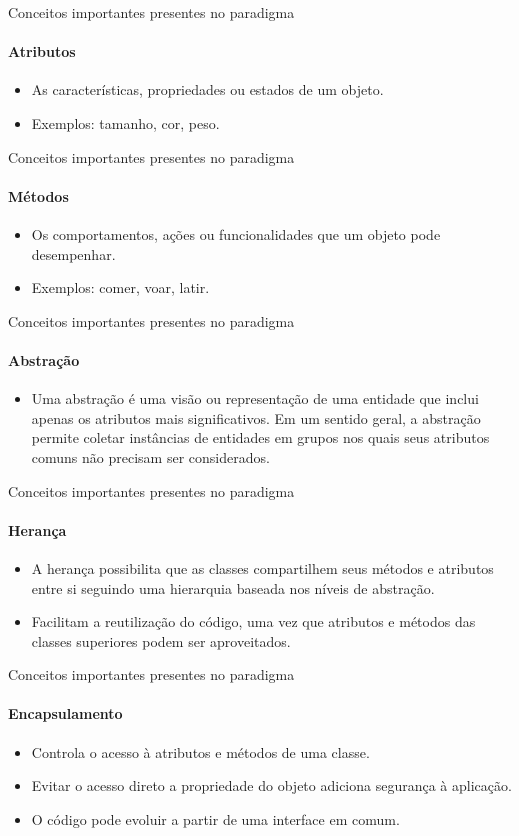 \begin{frame}{Conceitos importantes presentes no paradigma}
\framesubtitle{Atributos}
\begin{itemize}
    \item As características, propriedades ou estados de um objeto.
    \item Exemplos: tamanho, cor, peso. 
\end{itemize} 
\end{frame}

\begin{frame}{Conceitos importantes presentes no paradigma}
\framesubtitle{Métodos}
\begin{itemize}
    \item Os comportamentos, ações ou funcionalidades que um objeto pode desempenhar.
    \item Exemplos: comer, voar, latir.
\end{itemize} 
\end{frame}

\begin{frame}{Conceitos importantes presentes no paradigma}
\framesubtitle{Abstração}
\begin{itemize}
    \item Uma abstração é uma visão ou representação de uma entidade que inclui apenas os atributos mais significativos. Em um sentido geral, a abstração permite coletar instâncias de entidades em grupos nos quais seus atributos comuns não precisam ser considerados.
\end{itemize} 
\end{frame}

\begin{frame}{Conceitos importantes presentes no paradigma}
\framesubtitle{Herança}
\begin{itemize}
    \item A herança possibilita que as classes compartilhem seus métodos e atributos entre si seguindo uma hierarquia baseada nos níveis de abstração.
    \item Facilitam a reutilização do código, uma vez que atributos e métodos das classes superiores podem ser aproveitados.
\end{itemize} 
\end{frame}

\begin{frame}{Conceitos importantes presentes no paradigma}
\framesubtitle{Encapsulamento}
\begin{itemize}
    \item Controla o acesso à atributos e métodos de uma classe.
    \item Evitar o acesso direto a propriedade do objeto adiciona segurança à aplicação.
    \item O código pode evoluir a partir de uma interface em comum.
\end{itemize} 
\end{frame}

